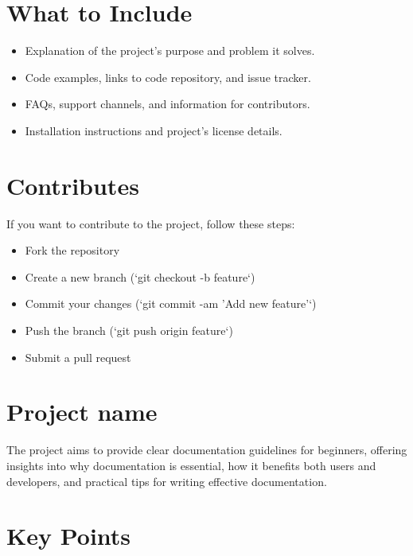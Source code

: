 \documentclass{article}
\begin{document}
\section{What to Include}
\begin{itemize}
    \item Explanation of the project's purpose and problem it solves.
    \item Code examples, links to code repository, and issue tracker.
    \item FAQs, support channels, and information for contributors.
    \item Installation instructions and project's license details.
\end{itemize}

\section{Contributes}

If you want to contribute to the project, follow these steps:
\begin{itemize}
    \item Fork the repository
    \item Create a new branch (`git checkout -b feature`)
    \item Commit your changes (`git commit -am 'Add new feature'`)
    \item Push the branch (`git push origin feature`)
    \item Submit a pull request
\end{itemize}

\section{Project name}
The project aims to provide clear documentation guidelines for beginners, offering insights into why documentation is essential, how it benefits both users and developers, and practical tips for writing effective documentation.

\section{Key Points}
\end{document}
